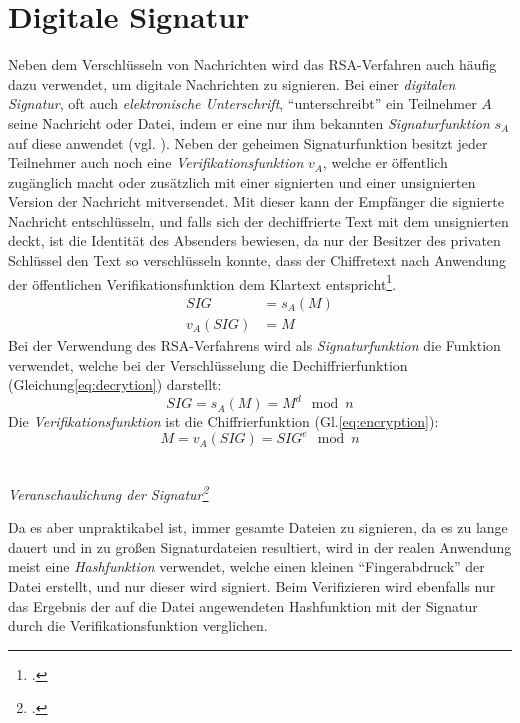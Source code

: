 \documentclass{scrarticle}
\begin{document}
    \section{Digitale Signatur}
        Neben dem Verschlüsseln von Nachrichten wird das RSA-Verfahren auch häufig dazu verwendet, um digitale Nachrichten zu signieren. Bei einer \emph{digitalen Signatur}, oft auch \emph{elektronische Unterschrift}, \enquote{unterschreibt} ein Teilnehmer $A$ seine Nachricht oder Datei, indem er eine nur ihm bekannten \emph{Signaturfunktion} $s_A$ auf diese anwendet (vgl. \cite[40-43]{beutelspacher2015}). Neben der geheimen Signaturfunktion besitzt jeder Teilnehmer auch noch eine \emph{Verifikationsfunktion} $v_A$, welche er öffentlich zugänglich macht oder zusätzlich mit einer signierten und einer unsignierten Version der Nachricht mitversendet. Mit dieser kann der Empfänger die signierte Nachricht entschlüsseln, und falls sich der dechiffrierte Text mit dem unsignierten deckt, ist die Identität des Absenders bewiesen, da nur der Besitzer des privaten Schlüssel den Text so verschlüsseln konnte, dass der Chiffretext nach Anwendung der öffentlichen Verifikationsfunktion dem Klartext entspricht\footcite[vgl.][68]{watjen2008}.
        \begin{align}
            SIG &= s_A(M) \\
            v_A(SIG) &= M
        \end{align}
        Bei der Verwendung des RSA-Verfahrens wird als \emph{Signaturfunktion} die Funktion verwendet, welche bei der Verschlüsselung die Dechiffrierfunktion (Gleichung\ref{eq:decrytion}) darstellt:
        \begin{equation}
            SIG = s_A(M) = M^{d}\mod{n}
        \end{equation}
        Die \emph{Verifikationsfunktion} ist die Chiffrierfunktion (Gl.\ref{eq:encryption}):
        \begin{equation}
            M = v_A(SIG) = SIG^{e}\mod{n}
        \end{equation}
        \begin{center}
            \\
            \emph{Veranschaulichung der Signatur\footcite[68]{watjen2008}}\\
        \end{center}
        Da es aber unpraktikabel ist, immer gesamte Dateien zu signieren, da es zu lange dauert und in zu großen Signaturdateien resultiert, wird in der realen Anwendung meist eine \emph{Hashfunktion} verwendet, welche einen kleinen \enquote{Fingerabdruck} der Datei erstellt, und nur dieser wird signiert. Beim Verifizieren wird ebenfalls nur das Ergebnis der auf die Datei angewendeten Hashfunktion mit der Signatur durch die Verifikationsfunktion verglichen.
\end{document}
